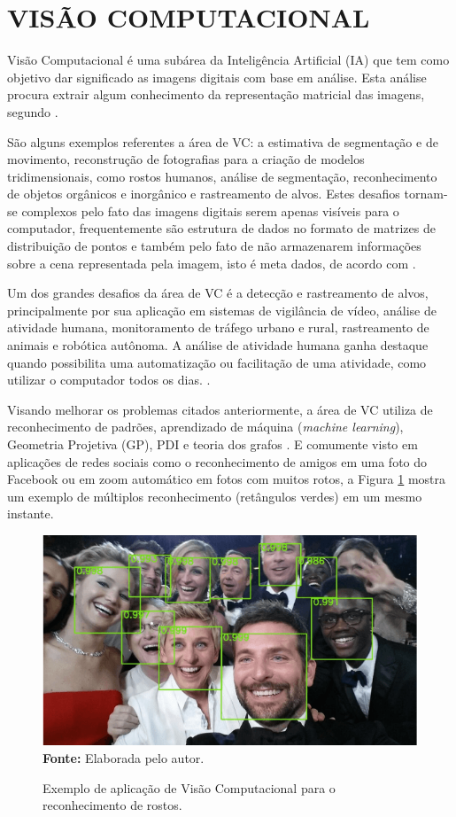 \section{VISÃO COMPUTACIONAL}\label{Sub:vc}
Visão Computacional é uma subárea da Inteligência Artificial (IA) que tem como objetivo dar significado as imagens digitais com base em análise. Esta análise procura extrair algum conhecimento da representação matricial das imagens, segundo . 

São alguns exemplos referentes a área de VC: a estimativa de segmentação e de movimento, reconstrução de fotografias para a criação de modelos tridimensionais, como rostos humanos, análise de segmentação, reconhecimento de objetos orgânicos e inorgânico e rastreamento de alvos. Estes desafios tornam-se complexos pelo fato das imagens digitais serem apenas visíveis para o computador, frequentemente são estrutura de dados no formato de matrizes de distribuição de pontos e também pelo fato de não armazenarem informações sobre a cena representada pela imagem, isto é meta dados, de acordo com .

Um dos grandes desafios da área de VC é a detecção e rastreamento de alvos, principalmente por sua aplicação em sistemas de vigilância de vídeo, análise de atividade humana, monitoramento de tráfego urbano e rural, rastreamento de animais e robótica autônoma. A análise de atividade humana ganha destaque quando possibilita uma automatização ou facilitação de uma atividade, como utilizar o computador todos os dias. \cite{alaya2012multipeople-UPPERCASE}.

Visando melhorar os problemas citados anteriormente, a área de VC utiliza de reconhecimento de padrões, aprendizado de máquina (\textit{machine learning}), Geometria Projetiva (GP), PDI e teoria dos grafos . E comumente visto em aplicações de redes sociais como o reconhecimento de amigos em uma foto do Facebook ou em zoom automático em fotos com muitos rotos, a Figura \ref{fig:exemplo-vc} mostra um exemplo de múltiplos reconhecimento (retângulos verdes) em um mesmo instante.

\begin{figure}[htbp]
\caption{Exemplo de aplicação de Visão Computacional para o reconhecimento de rostos.}
 \centering \includegraphics[scale=1]{img/figura-1.png}
 \textbf{Fonte:} Elaborada pelo autor.
\label{fig:exemplo-vc}
\end{figure}

